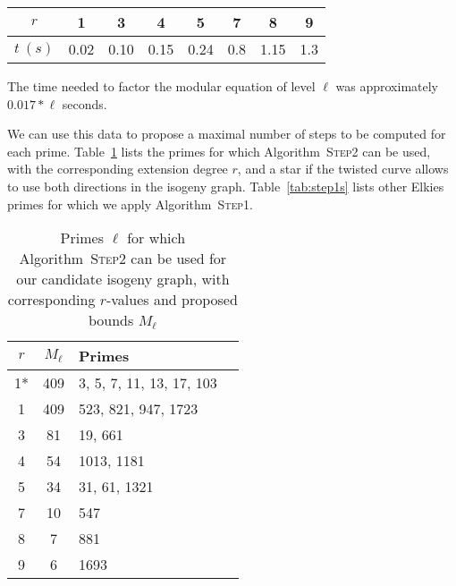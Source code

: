 \documentclass{article}
\newcommand{\algstyle}[1]{\textsc{#1}}
\theoremstyle{definition}
\begin{document}
\begin{center}
\begin{tabular}{c|ccccccc}
$r$ & 1 & 3 & 4 & 5 & 7 & 8 & 9 \\
\hline
$t\ (s)$ & 0.02 & 0.10 & 0.15 & 0.24 & 0.8 & 1.15 & 1.3
\end{tabular}
\end{center}
The time needed to factor the modular equation of level $\ell$
was approximately $0.017 * \ell$ seconds.

We can use this data to propose a maximal number of steps to be
computed for each prime. Table~\ref{tab:step2s}
lists the primes for which Algorithm~\algstyle{Step2} can be used, with
the corresponding extension degree $r$, and a star if the twisted curve
allows to use both directions in the isogeny graph.
Table~\ref{tab:step1s}
lists other Elkies primes for which we apply Algorithm~\algstyle{Step1}.

\begin{table}
\centering
\begin{tabular}{cclc}
$r$ & $M_\ell$ & Primes \\
\hline
1* & 409 & 3, 5, 7, 11, 13, 17, 103 \\
1 & 409 & 523, 821, 947, 1723 \\
3 & 81 & 19, 661 \\
4 & 54 & 1013, 1181 \\
5 & 34 & 31, 61, 1321 \\
7 & 10 & 547 \\
8 & 7 & 881 \\
9 & 6 & 1693
\end{tabular}
    \caption{Primes $\ell$ for which Algorithm~\algstyle{Step2} can be
    used for our candidate isogeny graph,
    with corresponding $r$-values and proposed bounds $M_\ell$}
    \label{tab:step2s}
\end{table}
\end{document}
